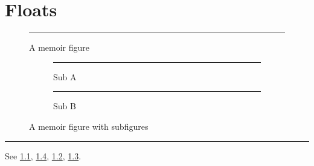 \documentclass{memoir}
\begin{document}
\listoffigures
\chapter{Floats}
\begin{figure}[htbp]
\centering\rule{3cm}{1cm}
\caption{A memoir figure}\label{fig:a}
\end{figure}
\begin{figure}[htbp]
\centering
\begin{subfigure}{.4\linewidth}\centering\rule{2cm}{1cm}\caption{Sub A}\label{fig:sa}\end{subfigure}
\begin{subfigure}{.4\linewidth}\centering\rule{2cm}{1cm}\caption{Sub B}\label{fig:sb}\end{subfigure}
\caption{A memoir figure with subfigures}\label{fig:b}
\end{figure}
\begin{table}[htbp]
\caption*{A starred memoir table caption}
\centering\rule{3cm}{1cm}
\end{table}
See \ref{fig:a}, \ref{fig:b}, \ref{fig:sa}, \ref{fig:sb}.
\end{document}

